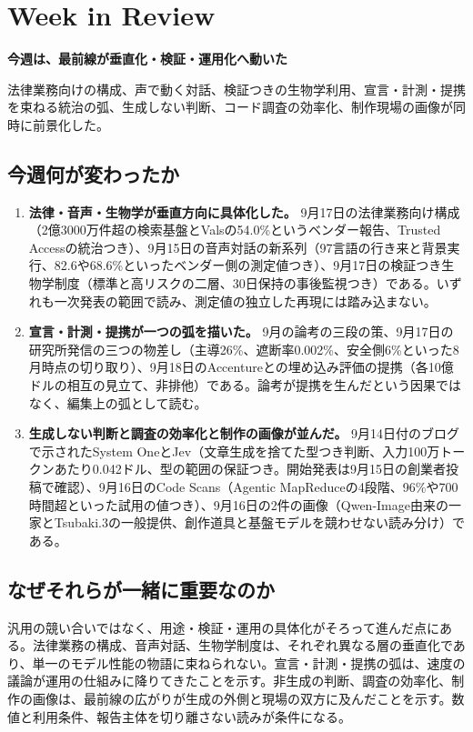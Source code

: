 \section{Week in Review}
\begin{wideflow}
{\Large\bfseries 今週は、最前線が垂直化・検証・運用化へ動いた}\par
\smallskip
{\color{SurveyMuted}法律業務向けの構成、声で動く対話、検証つきの生物学利用、宣言・計測・提携を束ねる統治の弧、生成しない判断、コード調査の効率化、制作現場の画像が同時に前景化した。}\par
\end{wideflow}

\subsection*{今週何が変わったか}
\begin{enumerate}[leftmargin=1.6em]
\item \textbf{法律・音声・生物学が垂直方向に具体化した。} 9月17日の法律業務向け構成（2億3000万件超の検索基盤とValsの54.0\%というベンダー報告、Trusted Accessの統治つき）、9月15日の音声対話の新系列（97言語の行き来と背景実行、82.6や68.6\%といったベンダー側の測定値つき）、9月17日の検証つき生物学制度（標準と高リスクの二層、30日保持の事後監視つき）である。いずれも一次発表の範囲で読み、測定値の独立した再現には踏み込まない。
\item \textbf{宣言・計測・提携が一つの弧を描いた。} 9月の論考の三段の策、9月17日の研究所発信の三つの物差し（主導26\%、遮断率0.002\%、安全側6\%といった8月時点の切り取り）、9月18日のAccentureとの埋め込み評価の提携（各10億ドルの相互の見立て、非排他）である。論考が提携を生んだという因果ではなく、編集上の弧として読む。
\item \textbf{生成しない判断と調査の効率化と制作の画像が並んだ。} 9月14日付のブログで示されたSystem OneとJev（文章生成を捨てた型つき判断、入力100万トークンあたり0.042ドル、型の範囲の保証つき。開始発表は9月15日の創業者投稿で確認）、9月16日のCode Scans（Agentic MapReduceの4段階、96\%や700時間超といった試用の値つき）、9月16日の2件の画像（Qwen-Image由来の一家とTsubaki.3の一般提供、創作道具と基盤モデルを競わせない読み分け）である。
\end{enumerate}

\subsection*{なぜそれらが一緒に重要なのか}
汎用の競い合いではなく、用途・検証・運用の具体化がそろって進んだ点にある。法律業務の構成、音声対話、生物学制度は、それぞれ異なる層の垂直化であり、単一のモデル性能の物語に束ねられない。宣言・計測・提携の弧は、速度の議論が運用の仕組みに降りてきたことを示す。非生成の判断、調査の効率化、制作の画像は、最前線の広がりが生成の外側と現場の双方に及んだことを示す。数値と利用条件、報告主体を切り離さない読みが条件になる。

